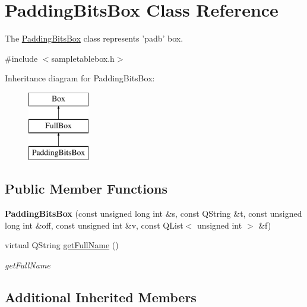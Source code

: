 \hypertarget{class_padding_bits_box}{\section{Padding\-Bits\-Box Class Reference}
\label{class_padding_bits_box}
}


The \hyperlink{class_padding_bits_box}{Padding\-Bits\-Box} class represents 'padb' box.  




{\ttfamily \#include $<$sampletablebox.\-h$>$}

Inheritance diagram for Padding\-Bits\-Box\-:\begin{figure}[H]
\begin{center}
\leavevmode
\includegraphics[height=3.000000cm]{class_padding_bits_box}
\end{center}
\end{figure}
\subsection*{Public Member Functions}
\begin{DoxyCompactItemize}
\item 
\hypertarget{class_padding_bits_box_a27f28dbc947e8d3d1458f89f20551e79}{{\bfseries Padding\-Bits\-Box} (const unsigned long int \&s, const Q\-String \&t, const unsigned long int \&off, const unsigned int \&v, const Q\-List$<$ unsigned int $>$ \&f)}\label{class_padding_bits_box_a27f28dbc947e8d3d1458f89f20551e79}

\item 
virtual Q\-String \hyperlink{class_padding_bits_box_ab355f0ebfa4a84ef4a2737bc9c264004}{get\-Full\-Name} ()
\begin{DoxyCompactList}\small\item\em get\-Full\-Name \end{DoxyCompactList}\end{DoxyCompactItemize}
\subsection*{Additional Inherited Members}



